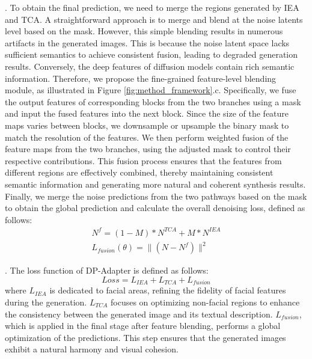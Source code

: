 .
To obtain the final prediction, we need to merge the regions generated by IEA and TCA. A straightforward approach is to merge and blend at the noise latents level based on the mask. However, this simple blending results in numerous artifacts in the generated images. This is because the noise latent space lacks sufficient semantics to achieve consistent fusion, leading to degraded generation results. Conversely, the deep features of diffusion models contain rich semantic information. Therefore, we propose the fine-grained feature-level blending module, as illustrated in Figure \ref{fig:method_framework}.c. Specifically, we fuse the output features of corresponding blocks from the two branches using a mask and input the fused features into the next block. Since the size of the feature maps varies between blocks, we downsample or upsample the binary mask to match the resolution of the features. We then perform weighted fusion of the feature maps from the two branches, using the adjusted mask to control their respective contributions. 
This fusion process ensures that the features from different regions are effectively combined, thereby maintaining consistent semantic information and generating more natural and coherent synthesis results.
Finally, we merge the noise predictions from the two pathways based on the mask to obtain the global prediction and calculate the overall denoising loss, defined as follows:
\begin{align}
    N^{f} = (1-M)*N^{TCA} + M * N^{IEA} \\
    L_{fusion}(\theta) = \lVert (N - N^{f})\rVert^2 
     \label{eq:alpha}
\end{align}

. The loss function of DP-Adapter is defined as follows:
\begin{equation}
    Loss = L_{IEA} + L_{TCA} + L_{fusion}
    \label{eq:fusion}
\end{equation}
where $L_{IEA}$ is dedicated to facial areas, refining the fidelity of facial features during the generation. $L_{TCA}$ focuses on optimizing non-facial regions to enhance the consistency between the generated image and its textual description. $L_{fusion}$, which is applied in the final stage after feature blending, performs a global optimization of the predictions. This step ensures that the generated images exhibit a natural harmony and visual cohesion.





